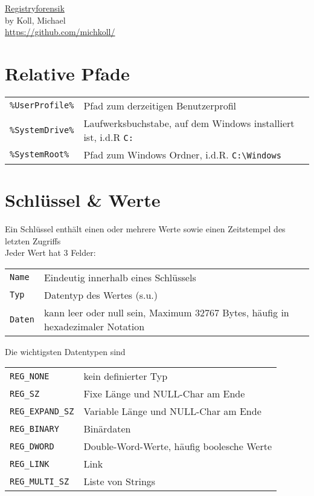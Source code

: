 \raggedright
\footnotesize
\begin{multicols}{3}	
	\setlength{\premulticols}{1pt}
	\setlength{\postmulticols}{1pt}
	\setlength{\multicolsep}{1pt}
	\setlength{\columnsep}{2pt}

\begin{center}
     \Large{\underline{Registryforensik}} \\
     \small by Koll, Michael \\
     \url{https://github.com/michkoll/}
\end{center}

\section{Relative Pfade}
\begin{tabular}{@{}p{\the\MyLen}%
				@{}p{\linewidth-\the\MyLen}@{}}
\texttt{\%UserProfile\%} & Pfad zum derzeitigen Benutzerprofil \\
\texttt{\%SystemDrive\%} & Laufwerksbuchstabe, auf dem Windows 
							installiert ist, i.d.R \texttt{C:} \\
\texttt{\%SystemRoot\%} & Pfad zum Windows Ordner, i.d.R. \texttt{C:\textbackslash Windows}
\end{tabular}	

\section{Schlüssel \& Werte}
Ein Schlüssel enthält einen oder mehrere Werte sowie einen Zeitstempel des letzten Zugriffs\\
Jeder Wert hat 3 Felder:
\settowidth{\MyLen}{value.fields.}
\begin{tabular}{@{}p{\the\MyLen}%
		@{}p{\linewidth-\the\MyLen}@{}}
	\texttt{Name} & Eindeutig innerhalb eines Schlüssels\\
	\texttt{Typ} & Datentyp des Wertes (s.u.)\\
	\texttt{Daten} & kann leer oder null sein, Maximum 32767 Bytes, häufig in hexadezimaler Notation\\
\end{tabular}
Die wichtigsten Datentypen sind
\settowidth{\MyLen}{Reg.Expand.leng}
\begin{tabular}{@{}p{\the\MyLen}%
		@{}p{\linewidth-\the\MyLen}@{}}
	\texttt{REG\_NONE} & kein definierter Typ\\
	\texttt{REG\_SZ} & Fixe Länge und NULL-Char am Ende\\
	\texttt{REG\_EXPAND\_SZ} & Variable Länge und NULL-Char am Ende\\
	\texttt{REG\_BINARY} & Binärdaten\\
	\texttt{REG\_DWORD} & Double-Word-Werte, häufig boolesche Werte\\
	\texttt{REG\_LINK} & Link\\
	\texttt{REG\_MULTI\_SZ} & Liste von Strings\\
\end{tabular}



\end{multicols}
